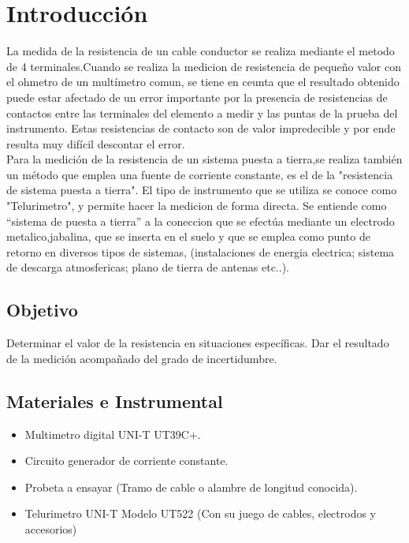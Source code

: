 \documentclass[12pt, letterpaper]{article}
\begin{document}
\newpage
\tableofcontents
\newpage

\section{Introducción}

La medida de la resistencia de un cable conductor se realiza mediante 
el metodo de 4 terminales.Cuando se realiza la medicion de resistencia
de pequeño valor con el ohmetro de un multímetro comun, se tiene en ceunta
que el resultado obtenido puede estar afectado de un error importante
por la presencia de resistencias de contactos entre las terminales del
elemento a medir y las puntas de la prueba del instrumento. Estas resistencias
de contacto son de valor impredecible y por ende resulta muy difícil descontar 
el error. \\
Para la medición de la resistencia de un sistema puesta a tierra,se realiza 
también un método que emplea una fuente de corriente constante, es el de la "resistencia
de sistema puesta a tierra". El tipo de instrumento que se utiliza se conoce como
"Telurimetro", y permite hacer la medicion de forma directa. Se entiende como “sistema de puesta a tierra” 
a la coneccion que se efectúa mediante un electrodo metalico,jabalina, que se inserta en el suelo y 
que se emplea como punto de retorno en diversos tipos de sistemas, (instalaciones de energia 
electrica; sistema de descarga atmosfericas; plano de tierra de antenas etc..).

\subsection{Objetivo}
Determinar el valor de la resistencia en situaciones específicas. Dar el resultado de la
medición acompañado del grado de incertidumbre.

\subsection{Materiales e Instrumental}
\begin{itemize}
	\item Multimetro digital UNI-T UT39C+.
	\item Circuito generador de corriente constante.
	\item Probeta a ensayar (Tramo de cable o alambre de longitud conocida).
	\item Telurimetro UNI-T Modelo UT522 (Con su juego de cables, electrodos y accesorios)
\end{itemize}
\end{document}
